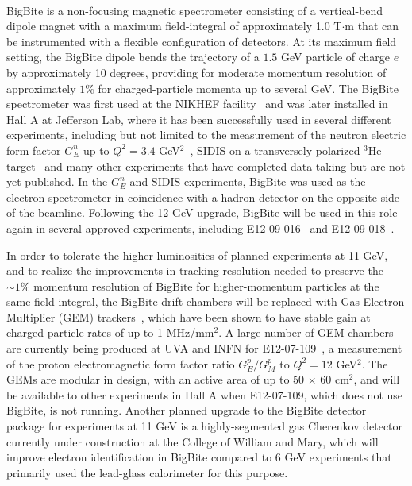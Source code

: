 \paragraph{}
BigBite is a non-focusing magnetic spectrometer consisting of a vertical-bend dipole magnet with a maximum field-integral of approximately 1.0 T$\cdot$m that can be instrumented with a flexible configuration of detectors. At its maximum field setting, the BigBite dipole bends the trajectory of a $1.5$ GeV particle of charge $e$ by approximately 10 degrees, providing for moderate momentum resolution of approximately $1\%$ for charged-particle momenta up to several GeV. The BigBite spectrometer was first used at the NIKHEF facility~\cite{BigBite1998,BigBiteOptics1998} and was later installed in Hall A at Jefferson Lab, where it has been successfully used in several different experiments, including but not limited to the measurement of the neutron electric form factor $G_E^n$ up to $Q^2 = 3.4$ GeV$^2$~\cite{GEN2010}, SIDIS on a transversely polarized $^3$He target~\cite{E06010_AUT_PRL} and many other experiments that have completed data taking but are not yet published. In the $G_E^n$ and SIDIS experiments, BigBite was used as the electron spectrometer in coincidence with a hadron detector on the opposite side of the beamline. Following the 12 GeV upgrade, BigBite will be used in this role again in several approved experiments, including E12-09-016~\cite{GEN2} and E12-09-018~\cite{SBS_SIDIS}.

In order to tolerate the higher luminosities of planned experiments at 11 GeV, and to realize the improvements in tracking resolution needed to preserve the $\sim1\%$ momentum resolution of BigBite for higher-momentum particles at the same field integral, the BigBite drift chambers will be replaced with Gas Electron Multiplier (GEM) trackers~\cite{Sauli_GEM, GEM_test_1999}, which have been shown to have stable gain at charged-particle rates of up to 1 MHz/mm$^2$. A large number of GEM chambers are currently being produced at UVA and INFN for E12-07-109~\cite{GEP5}, a measurement of the proton electromagnetic form factor ratio $G_E^p/G_M^p$ to $Q^2 = 12$ GeV$^2$. The GEMs are modular in design, with an active area of up to 50 $\times$ 60 cm$^2$, and will be available to other experiments in Hall A when E12-07-109, which does not use BigBite, is not running. Another planned upgrade to the BigBite detector package for experiments at 11 GeV is a highly-segmented gas Cherenkov detector currently under construction at the College of William and Mary, which will improve electron identification in BigBite compared to 6 GeV experiments that primarily used the lead-glass calorimeter for this purpose.
